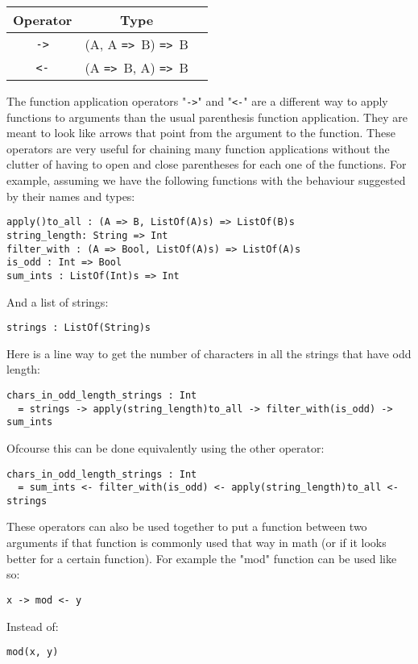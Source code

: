 \documentclass{article}
\def\ra{\texttt{=>}\ }
\begin{document}
\begin{center}
\begin{tabular}{ |c|c|c| } 
\hline
Operator & Type \\ 
\hline
\hline
\texttt{->} & (A, A \ra B) \ra B \\
\hline
\texttt{<-} & (A \ra B, A) \ra B \\
\hline
\end{tabular}
\end{center}
The function application operators "\texttt{->}" and "\texttt{<-}" are a
different way to apply functions to arguments than the usual parenthesis
function application.  They are meant to look like arrows that point from the
argument to the function.  These operators are very useful for chaining many
function applications without the clutter of having to open and close
parentheses for each one of the functions.  For example, assuming we have the
following functions with the behaviour suggested by their names and types:
\begin{verbatim}
apply()to_all : (A => B, ListOf(A)s) => ListOf(B)s
string_length: String => Int
filter_with : (A => Bool, ListOf(A)s) => ListOf(A)s
is_odd : Int => Bool
sum_ints : ListOf(Int)s => Int
\end{verbatim}
And a list of strings:
\begin{verbatim}
strings : ListOf(String)s
\end{verbatim}
Here is a line way to get the number of characters in all the strings that have 
odd length:
\begin{verbatim}
chars_in_odd_length_strings : Int
  = strings -> apply(string_length)to_all -> filter_with(is_odd) -> sum_ints
\end{verbatim}
Ofcourse this can be done equivalently using the other operator:
\begin{verbatim}
chars_in_odd_length_strings : Int
  = sum_ints <- filter_with(is_odd) <- apply(string_length)to_all <- strings

\end{verbatim}
These operators can also be used together to put a function between two arguments
if that function is commonly used that way in math (or if it looks better for a
certain function). For example the "mod" function can be used like so:
\begin{center}
\texttt{x -> mod <- y}
\end{center}
Instead of:
\begin{center}
\texttt{mod(x, y)}
\end{center}
\end{document}
